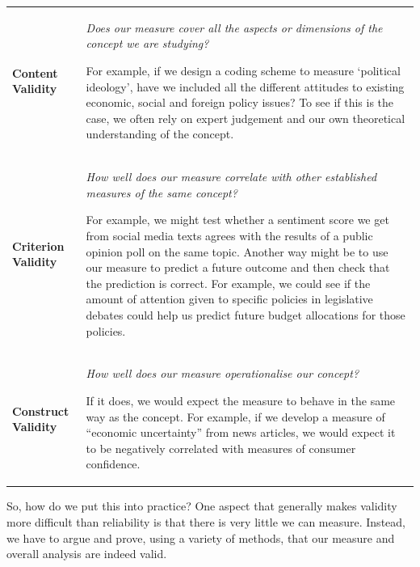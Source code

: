 \documentclass[
]{book}
\begin{document}
\begin{longtable}[]{@{}
  >{\raggedright\arraybackslash}p{}
  >{\raggedright\arraybackslash}p{}@{}}
\toprule\noalign{}
\endhead
\bottomrule\noalign{}
\endlastfoot
\textbf{Content Validity} & \emph{Does our measure cover all the aspects or dimensions of the concept we are studying?}

For example, if we design a coding scheme to measure `political ideology', have we included all the different attitudes to existing economic, social and foreign policy issues? To see if this is the case, we often rely on expert judgement and our own theoretical understanding of the concept. \\
\textbf{Criterion Validity} & \emph{How well does our measure correlate with other established measures of the same concept?}

For example, we might test whether a sentiment score we get from social media texts agrees with the results of a public opinion poll on the same topic. Another way might be to use our measure to predict a future outcome and then check that the prediction is correct. For example, we could see if the amount of attention given to specific policies in legislative debates could help us predict future budget allocations for those policies. \\
\textbf{Construct Validity} & \emph{How well does our measure operationalise our concept?}

If it does, we would expect the measure to behave in the same way as the concept. For example, if we develop a measure of ``economic uncertainty'' from news articles, we would expect it to be negatively correlated with measures of consumer confidence. \\
\end{longtable}

So, how do we put this into practice? One aspect that generally makes validity more difficult than reliability is that there is very little we can measure. Instead, we have to argue and prove, using a variety of methods, that our measure and overall analysis are indeed valid.
\end{document}
